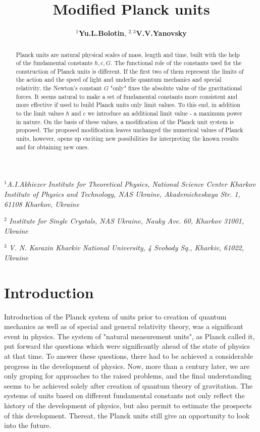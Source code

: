 \documentclass [12pt]{article}
\title{Modified Planck units}
\author{$^{1}$\textbf{Yu.L.Bolotin}, $^{2,3}$\textbf{V.V.Yanovsky} }
\begin{document}
 \maketitle

$^{1}$\textit{A.I.Akhiezer Institute for Theoretical Physics, National Science Center Kharkov Institute of Physics and Technology,
NAS Ukraine, Akademicheskaya Str. 1, 61108 Kharkov, Ukraine}

$^{2}$ \textit{Institute for Single Crystals, NAS Ukraine, Nauky Ave. 60, Kharkov 31001, Ukraine}

$^{3}$\textit{ V. N. Karazin Kharkiv National University, 4 Svobody Sq., Kharkiv, 61022, Ukraine}


\bigskip

\begin{abstract}Planck units are natural physical scales of mass, length and time, built with the help of the fundamental constants $\hbar, c, G$. The functional role of the constants used for the construction of Planck units is different. If the first two of them represent the limits of the action and the speed of light and underlie quantum mechanics and special relativity, the Newton's constant $G$  "only" fixes the absolute value of the gravitational forces. It seems natural to make a set of fundamental constants more consistent and more effective if used to build Planck units only limit values.  To this end, in addition to the limit values $\hbar $  and $c$ we introduce an additional limit value - a maximum power in nature. On the basis of these values, a modification of the Planck unit system is proposed. The proposed modification leaves unchanged the numerical values of Planck units, however, opens up exciting new possibilities for interpreting the known results and for obtaining  new ones.
\end{abstract}


\section{Introduction}

Introduction of the Planck system of units  \cite{s1} prior to creation of quantum mechanics as well as of special and general relativity theory, was a significant event in physics.  The   system of "natural measurement units", as Planck called it,  put forward the questions which were significantly ahead of the state of physics at that time.  To answer these questions, there had to be achieved a considerable progress in the development of physics. Now, more than a century later, we are only groping for approaches to the raised problems, and the final understanding seems to be achieved solely after creation of quantum theory of gravitation. The systems of units based on different fundamental constants not only reflect the history of the development of physics, but also permit to estimate the prospects  of this development. Thereat,  the Planck units still  give an opportunity to look into the future.
\end{document}
